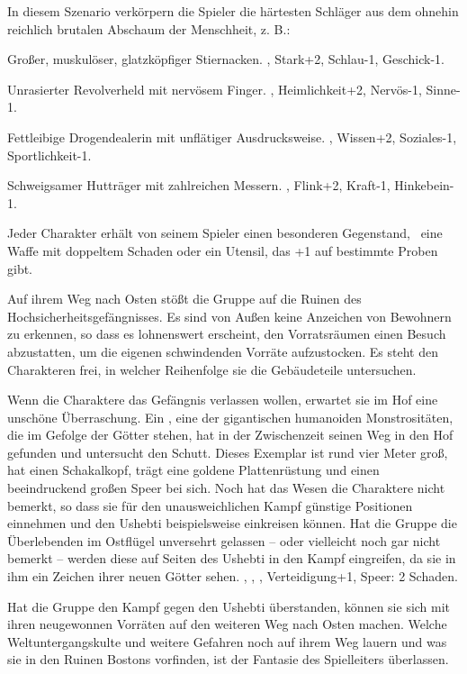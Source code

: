 {	

		\noindent
		In diesem Szenario verkörpern die Spieler die härtesten Schläger aus dem ohnehin reichlich brutalen Abschaum der Menschheit, z. B.:

		 Großer, muskulöser, glatzköpfiger Stier\-nacken. , Stark+2, Schlau-1, Geschick-1.

		 Unrasierter Revolverheld mit nervösem Finger. , Heimlichkeit+2, Nervös-1, Sinne-1.

		 Fettleibige Drogendealerin mit unflätiger Ausdrucksweise. , Wissen+2, Soziales-1, Sportlichkeit-1.

		 Schweigsamer Hutträger mit zahlreichen Messern. , Flink+2, Kraft-1, Hinkebein-1.

		Jeder Charakter erhält von seinem Spieler einen besonderen Gegenstand, \zB\ eine Waffe mit doppeltem Schaden oder ein Utensil, das +1 auf bestimmte Proben gibt.


		\noindent
		Auf ihrem Weg nach Osten stößt die Gruppe auf die Ruinen des Hochsicherheitsgefängnisses. Es sind von Außen keine Anzeichen von Bewohnern zu erkennen, so dass es lohnenswert erscheint, den Vorratsräumen einen Besuch abzustatten, um die eigenen schwindenden Vorräte aufzustocken. Es steht den Charakteren frei, in welcher Reihenfolge sie die Gebäudeteile untersuchen.

		Wenn die Charaktere das Gefängnis verlassen wollen, erwartet sie im Hof eine unschöne Überraschung. Ein , eine der gigantischen humanoiden Monstrositäten, die im Gefolge der Götter stehen, hat in der Zwischenzeit seinen Weg in den Hof gefunden und untersucht den Schutt. Dieses Exemplar ist rund vier Meter groß, hat einen Schakalkopf, trägt eine goldene Plattenrüstung und einen beeindruckend großen Speer bei sich. Noch hat das Wesen die Charaktere nicht bemerkt, so dass sie für den unausweichlichen Kampf günstige Positionen einnehmen und den Ushebti beispielsweise einkreisen können. Hat die Gruppe die Überlebenden im Ostflügel unversehrt gelassen -- oder vielleicht noch gar nicht bemerkt -- werden diese auf Seiten des Ushebti in den Kampf eingreifen, da sie in ihm ein Zeichen ihrer neuen Götter sehen.  , , , Verteidigung+1, Speer: 2 Schaden.


		\noindent
		Hat die Gruppe den Kampf gegen den Ushebti überstanden, können sie sich mit ihren neugewonnen Vorräten auf den weiteren Weg nach Osten machen. Welche Weltuntergangskulte und weitere Gefahren noch auf ihrem Weg lauern und was sie in den Ruinen Bostons vorfinden, ist der Fantasie des Spielleiters überlassen.
}

